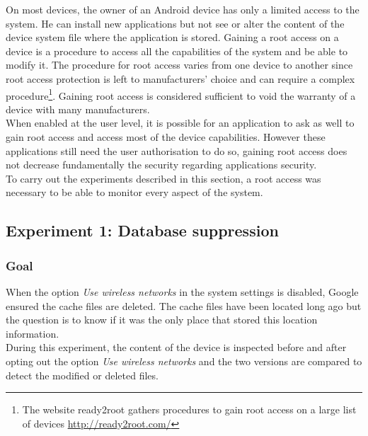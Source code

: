 On most devices, the owner of an Android device has only a limited access to the system.
He can install new applications but not see or alter the content of the device system file where the application is stored.
Gaining a root access on a device is a procedure to access all the capabilities of the system and be able to modify it.
The procedure for root access varies from one device to another since root access protection is left to manufacturers' choice and can require a complex procedure\footnote{The website ready2root gathers procedures to gain root access on a large list of devices \url{http://ready2root.com/}}.
Gaining root access is considered sufficient to void the warranty of a device with many manufacturers.\\

When enabled at the user level, it is possible for an application to ask as well to gain root access and access most of the device capabilities.
However these applications still need the user authorisation to do so, gaining root access does not decrease fundamentally the security regarding applications security.\\

To carry out the experiments described in this section, a root access was necessary to be able to monitor every aspect of the system.

\subsection{Experiment 1: Database suppression}

\subsubsection{Goal}

When the option \emph{Use wireless networks} in the system settings is disabled, Google ensured the cache files are deleted.
The cache files have been located long ago but the question is to know if it was the only place that stored this location information.\\

During this experiment, the content of the device is inspected before and after opting out the option \emph{Use wireless networks} and the two versions are compared to detect the modified or deleted files.

